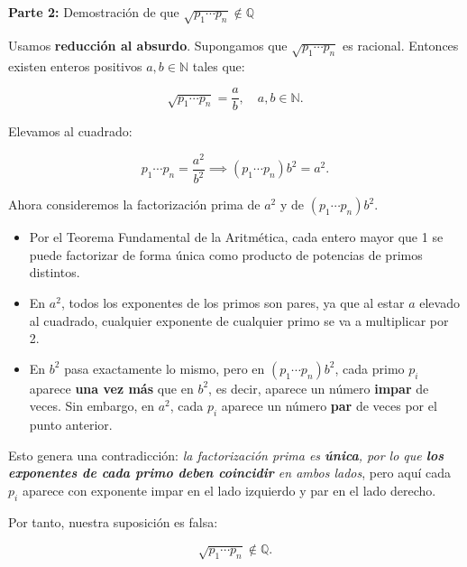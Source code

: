 \documentclass[a4paper,12pt]{article}
\begin{document}
\begin{ejercicio}[title=Ejercicio 20]

\textbf{Parte 2:} Demostración de que $\sqrt{p_1\cdots p_n} \notin \mathbb{Q}$

Usamos \textbf{reducción al absurdo}. Supongamos que $\sqrt{p_1\cdots p_n}$ es racional. Entonces existen enteros positivos $a,b \in \mathbb{N}$ tales que:

\[
\sqrt{p_1\cdots p_n} = \frac{a}{b}, \quad a,b \in \mathbb{N}.
\]

Elevamos al cuadrado:

\[
p_1 \cdots p_n = \frac{a^2}{b^2} \implies (p_1 \cdots p_n) b^2 = a^2.
\]

Ahora consideremos la factorización prima de $a^2$ y de $(p_1 \cdots p_n)b^2$.  

\begin{itemize}
    \item Por el Teorema Fundamental de la Aritmética, cada entero mayor que 1 se puede factorizar de forma única como producto de potencias de primos distintos.
    \item En $a^2$, todos los exponentes de los primos son pares, ya que al estar $a$ elevado al cuadrado, cualquier exponente de cualquier primo se va a multiplicar por 2. 
    \item En $b^2$ pasa exactamente lo mismo, pero en $(p_1 \cdots p_n)b^2$, cada primo $p_i$ aparece \textbf{una vez más} que en $b^2$, es decir, aparece un número \textbf{impar} de veces. Sin embargo, en $a^2$, cada $p_i$ aparece un número \textbf{par} de veces por el punto anterior.
\end{itemize}

Esto genera una contradicción: \emph{la factorización prima es \textbf{única}, por lo que \textbf{los exponentes de cada primo deben coincidir} en ambos lados}, pero aquí cada $p_i$ aparece con exponente impar en el lado izquierdo y par en el lado derecho.  

Por tanto, nuestra suposición es falsa:

\[
\boxed{\sqrt{p_1\cdots p_n} \notin \mathbb{Q}}.
\]

\end{ejercicio}
\end{document}
